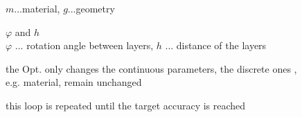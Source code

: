 \begin{figure}[H]
{\begin{description}
{        $m$...material, $g$...geometry}
        \item[\protect{\parbox[t]{0.2\linewidth}{stack\\params}}]
        \parbox[t]{0.8\linewidth}{$\varphi$ and $h$\\
        $\varphi$ ... rotation angle between layers, $h$ ... distance of the layers  }
        \item[\protect{\parbox[t]{0.2\linewidth}{new\\params}}]
        \parbox[t]{0.8\linewidth}{the Opt. only changes the continuous parameters, the discrete ones , e.g. material, remain unchanged}
        \item[\protect{\parbox[t]{0.2\linewidth}{optimization\\loop}}]
        \parbox[t]{0.8\linewidth}{this loop is repeated until the target accuracy is reached}
    \end{description}}
    \label{fig:al:algo}
\end{figure}
